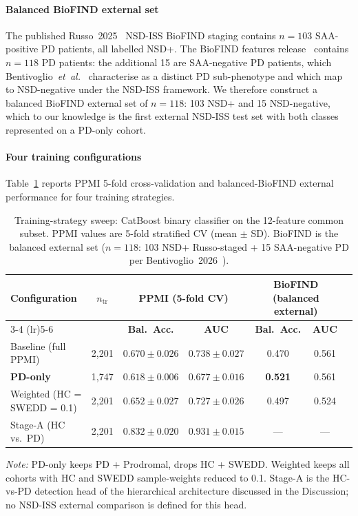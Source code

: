 \documentclass[10pt,letterpaper]{article}
\begin{document}
\paragraph*{Balanced BioFIND external set} The published Russo~2025~\cite{russo2025} NSD-ISS BioFIND staging contains $n{=}103$ SAA-positive PD patients, all labelled NSD+. The BioFIND features release~\cite{biofind2025nsd} contains $n{=}118$ PD patients: the additional 15 are SAA-negative PD patients, which Bentivoglio~\textit{et~al.}~\cite{bentivoglio2026saaneg} characterise as a distinct PD sub-phenotype and which map to NSD-negative under the NSD-ISS framework. We therefore construct a balanced BioFIND external set of $n{=}118$: 103 NSD+ and 15 NSD-negative, which to our knowledge is the first external NSD-ISS test set with both classes represented on a PD-only cohort.

\paragraph*{Four training configurations} Table~\ref{p1:tab:pdonly} reports PPMI 5-fold cross-validation and balanced-BioFIND external performance for four training strategies.

\begin{table}[!t]
\caption{Training-strategy sweep: CatBoost binary classifier on the 12-feature common subset. PPMI values are 5-fold stratified CV (mean $\pm$ SD). BioFIND is the balanced external set ($n{=}118$: 103 NSD+ Russo-staged + 15 SAA-negative PD per Bentivoglio~2026~\cite{bentivoglio2026saaneg}).}
\label{p1:tab:pdonly}
\centering
\footnotesize
\setlength{\tabcolsep}{6pt}
\begin{tabular}{@{}lcccccc@{}}
\toprule
\textbf{Configuration} & \textbf{$n_{\mathrm{tr}}$} & \multicolumn{2}{c}{\textbf{PPMI (5-fold CV)}} & \multicolumn{2}{c}{\textbf{BioFIND (balanced external)}} \\
\cmidrule(lr){3-4} \cmidrule(lr){5-6}
 & & \textbf{Bal.\ Acc.} & \textbf{AUC} & \textbf{Bal.\ Acc.} & \textbf{AUC} \\
\midrule
Baseline (full PPMI)        & 2{,}201 & $0.670 \pm 0.026$          & $0.738 \pm 0.027$          & 0.470          & 0.561 \\
\textbf{PD-only}            & 1{,}747 & $0.618 \pm 0.006$          & $0.677 \pm 0.016$          & \textbf{0.521} & 0.561 \\
Weighted (HC = SWEDD = 0.1) & 2{,}201 & $0.652 \pm 0.027$          & $0.727 \pm 0.026$          & 0.497          & 0.524 \\
\midrule
Stage-A (HC vs.\ PD)        & 2{,}201 & $\mathbf{0.832 \pm 0.020}$ & $\mathbf{0.931 \pm 0.015}$ & ---            & ---   \\
\bottomrule
\end{tabular}
\vspace{2pt}

\raggedright\scriptsize\textit{Note:} PD-only keeps PD + Prodromal, drops HC + SWEDD. Weighted keeps all cohorts with HC and SWEDD sample-weights reduced to 0.1. Stage-A is the HC-vs-PD detection head of the hierarchical architecture discussed in the Discussion; no NSD-ISS external comparison is defined for this head.
\end{table}
\end{document}

